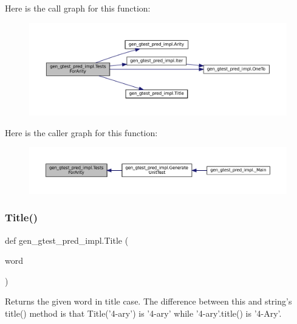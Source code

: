 Here is the call graph for this function\+:
\nopagebreak
\begin{figure}[H]
\begin{center}
\leavevmode
\includegraphics[width=350pt]{namespacegen__gtest__pred__impl_ab0da913fa15e5695d5bb2dd1de5dec57_cgraph}
\end{center}
\end{figure}
Here is the caller graph for this function\+:
\nopagebreak
\begin{figure}[H]
\begin{center}
\leavevmode
\includegraphics[width=350pt]{namespacegen__gtest__pred__impl_ab0da913fa15e5695d5bb2dd1de5dec57_icgraph}
\end{center}
\end{figure}
\mbox{\label{namespacegen__gtest__pred__impl_ae49dd9bd9152dbcb3ca7994ce04c37ba}} 
\subsubsection{\texorpdfstring{Title()}{Title()}}
{\footnotesize\ttfamily def gen\+\_\+gtest\+\_\+pred\+\_\+impl.\+Title (\begin{DoxyParamCaption}\item[{}]{word }\end{DoxyParamCaption})}

\begin{DoxyVerb}Returns the given word in title case.  The difference between
this and string's title() method is that Title('4-ary') is '4-ary'
while '4-ary'.title() is '4-Ary'.\end{DoxyVerb}
 


